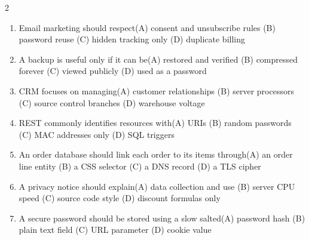 \documentclass[a4paper]{article}
\begin{document}
\begin{multicols*}{2}
\begin{enumerate}
\item Email marketing should respect\newline\hspace*{0.6em}(A) consent and unsubscribe rules \quad (B) password reuse \newline\hspace*{0.6em}(C) hidden tracking only \quad (D) duplicate billing
\item A backup is useful only if it can be\newline\hspace*{0.6em}(A) restored and verified \quad (B) compressed forever \newline\hspace*{0.6em}(C) viewed publicly \quad (D) used as a password
\item CRM focuses on managing\newline\hspace*{0.6em}(A) customer relationships \quad (B) server processors \newline\hspace*{0.6em}(C) source control branches \quad (D) warehouse voltage
\item REST commonly identifies resources with\newline\hspace*{0.6em}(A) URIs \quad (B) random passwords \newline\hspace*{0.6em}(C) MAC addresses only \quad (D) SQL triggers
\item An order database should link each order to its items through\newline\hspace*{0.6em}(A) an order line entity \quad (B) a CSS selector \newline\hspace*{0.6em}(C) a DNS record \quad (D) a TLS cipher
\item A privacy notice should explain\newline\hspace*{0.6em}(A) data collection and use \quad (B) server CPU speed \newline\hspace*{0.6em}(C) source code style \quad (D) discount formulas only
\item A secure password should be stored using a slow salted\newline\hspace*{0.6em}(A) password hash \quad (B) plain text field \newline\hspace*{0.6em}(C) URL parameter \quad (D) cookie value

\end{enumerate}
\end{multicols*}
\end{document}
